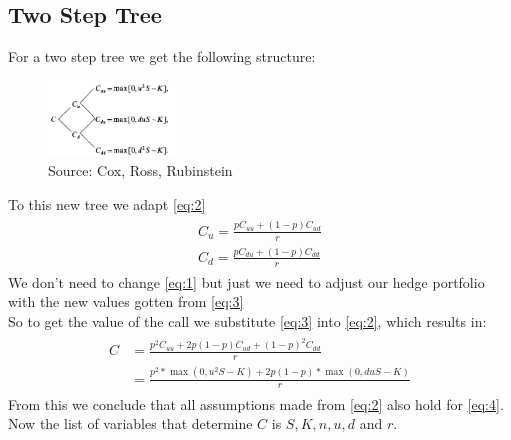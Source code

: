 \documentclass{article}
\begin{document}
\subsection{Two Step Tree}
For a two step tree we get the following structure:\\
\begin{figure}
\centering
\includegraphics[width=0.3\textwidth]{two_step_tree.png}
\caption{\label{fig:twostep}Source: Cox, Ross, Rubinstein}
\end{figure}
To this new tree we adapt \ref{eq:2}
\begin{align}\label{eq:3}
    \begin{split}
    C_{u} = \frac{p C_{uu} + (1-p) C_{ud}}{r} \\
    C_{d} = \frac{p C_{du} + (1-p) C_{dd}}{r}
    \end{split}
\end{align}
We don't need to change \ref{eq:1}  but just we need to adjust our hedge portfolio with the new values gotten from \ref{eq:3} \\
So to get the value of the call we substitute \ref{eq:3} into \ref{eq:2}, which results in:
\begin{align}\label{eq:4}
    \begin{split}
    C & = \frac{p^{2} C_{uu} + 2 p (1 - p)  C_{ud} + (1 - p)^{2}  C_{dd}}{r} \\
    & = \frac{p^{2}*\max(0, u^{2}S - K) + 2 p (1 - p) * \max(0, duS - K)}{r}
    \end{split}
\end{align}
From this we conclude that all assumptions made from \ref{eq:2} also hold for \ref{eq:4}. Now the list of variables that determine $C$ is $S, K, n, u, d$ and $r$.
\end{document}
